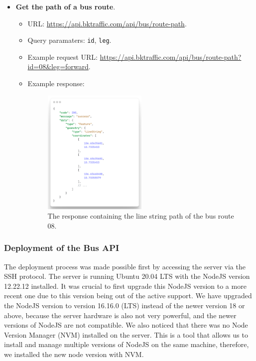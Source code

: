 \begin{itemize}
    \item \textbf{Get the path of a bus route}.
    \begin{itemize}
        \item URL: \url{https://api.bktraffic.com/api/bus/route-path}.
        \item Query paramaters: \lstinline{id}, \lstinline{leg}.
        \item Example request URL: \url{https://api.bktraffic.com/api/bus/route-path?id=08&leg=forward}.
        \item Example response:
        \begin{figure}[H]
            \centering
            \includegraphics[width=0.5\textwidth]{assets/images/Implementation/route_path_response.png}
            \caption{The response containing the line string path of the bus route 08.}
            \label{fig:route_path_response}
        \end{figure}
    \end{itemize} 
\end{itemize}

\subsubsection{Deployment of the Bus API}
The deployment process was made possible first by accessing the server via the SSH protocol. The server is running Ubuntu 20.04 LTS with the NodeJS version 12.22.12 installed. It was crucial to first upgrade this NodeJS version to a more recent one due to this version being out of the active support. We have upgraded the NodeJS version to version 16.16.0 (LTS) instead of the newer version 18 or above, because the server hardware is also not very powerful, and the newer versions of NodeJS are not compatible. We also noticed that there was no Node Version Manager (NVM) installed on the server. This is a tool that allows us to install and manage multiple versions of NodeJS on the same machine, therefore, we installed the new node version with NVM.

